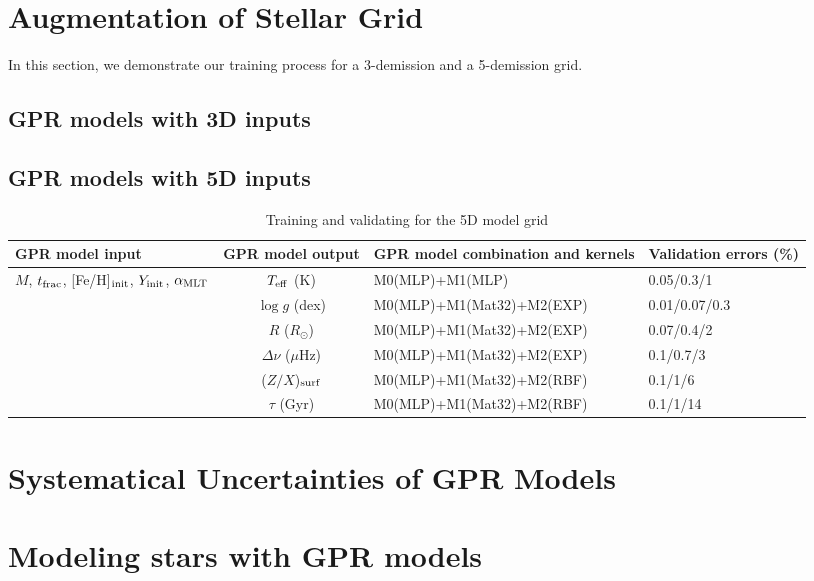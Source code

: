\section{Augmentation of Stellar Grid}\label{sec:augmentation}
In this section, we demonstrate our training process for a 3-demission and a 5-demission grid.  

\subsection{GPR models with 3D inputs}

\subsection{GPR models with 5D inputs}



\begin{table*}
	\centering
	\caption{Training and validating for the 5D model grid}
	\label{tab:gpdetails}
	\begin{tabular}{lcll} %
		\hline
		 GPR model input &\multicolumn{1}{l}{GPR model output} & \multicolumn{1}{c}{GPR model combination and kernels}& 
		  \multicolumn{1}{c}{Validation errors (\%)}\\ 
		 \hline
		 $M$, $t_{\rm frac}$, [Fe/H]$_{\rm init}$, $Y_{\rm init}$, $\alpha_{\rm MLT}$ & $T_{\rm eff}$ (K) &M0(MLP)+M1(MLP)& 0.05/0.3/1\\
		 &$\log g$ (dex)  & M0(MLP)+M1(Mat32)+M2(EXP) &0.01/0.07/0.3\\
		 &$R$ ($R_{\odot}$) & M0(MLP)+M1(Mat32)+M2(EXP) &0.07/0.4/2\\
		  &$\Delta\nu$ ($\mu$Hz) & M0(MLP)+M1(Mat32)+M2(EXP) &0.1/0.7/3\\
		  &($Z/X$)$_{\rm surf}$ & M0(MLP)+M1(Mat32)+M2(RBF) & 0.1/1/6\\
		  &$\tau$ (Gyr) & M0(MLP)+M1(Mat32)+M2(RBF) & 0.1/1/14\\
       \hline
	\end{tabular}
\end{table*}


\section{Systematical Uncertainties of GPR Models}\label{sec:sys}

\section{Modeling stars with GPR models}

